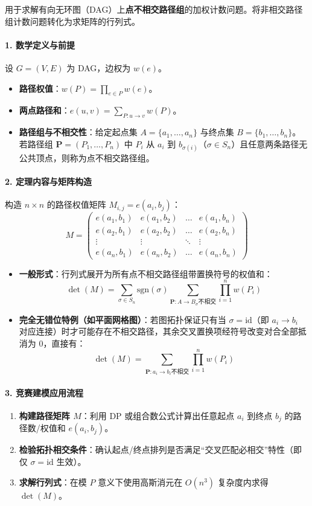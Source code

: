 \noindent
用于求解有向无环图（DAG）上\textbf{点不相交路径组}的加权计数问题。将非相交路径组计数问题转化为求矩阵的行列式。

\paragraph{1. 数学定义与前提}
设 $G = (V, E)$ 为 DAG，边权为 $w(e)$。
\begin{itemize}
    \item \textbf{路径权值}：$w(P) = \prod_{e \in P} w(e)$。
    \item \textbf{两点路径和}：$e(u, v) = \sum_{P: u \to v} w(P)$。
    \item \textbf{路径组与不相交性}：给定起点集 $A = \{a_1, \dots, a_n\}$ 与终点集 $B = \{b_1, \dots, b_n\}$。若路径组 $\mathbf{P} = (P_1, \dots, P_n)$ 中 $P_i$ 从 $a_i$ 到 $b_{\sigma(i)}$（$\sigma \in S_n$）且任意两条路径无公共顶点，则称为点不相交路径组。
\end{itemize}

\paragraph{2. 定理内容与矩阵构造}
构造 $n \times n$ 的路径权值矩阵 $M_{i, j} = e(a_i, b_j)$：
\[
M = \begin{pmatrix} 
e(a_1, b_1) & e(a_1, b_2) & \dots & e(a_1, b_n) \\ 
e(a_2, b_1) & e(a_2, b_2) & \dots & e(a_2, b_n) \\ 
\vdots & \vdots & \ddots & \vdots \\ 
e(a_n, b_1) & e(a_n, b_2) & \dots & e(a_n, b_n) 
\end{pmatrix}
\]
\begin{itemize}
    \item \textbf{一般形式}：行列式展开为所有点不相交路径组带置换符号的权值和：
    \[
    \det(M) = \sum_{\sigma \in S_n} \mathrm{sgn}(\sigma) \sum_{\mathbf{P}: A \to B_\sigma \text{不相交}} \prod_{i=1}^n w(P_i)
    \]
    \item \textbf{完全无错位特例（如平面网格图）}：若图拓扑保证只有当 $\sigma = \mathrm{id}$（即 $a_i \to b_i$ 对应连接）时才可能存在不相交路径，其余交叉置换项经符号改变对合全部抵消为 $0$，直接有：
    \[
    \det(M) = \sum_{\mathbf{P}: a_i \to b_i \text{不相交}} \prod_{i=1}^n w(P_i)
    \]
\end{itemize}

\paragraph{3. 竞赛建模应用流程}
\begin{enumerate}
    \item \textbf{构建路径矩阵 $M$}：利用 DP 或组合数公式计算出任意起点 $a_i$ 到终点 $b_j$ 的路径数/权值和 $e(a_i, b_j)$。
    \item \textbf{检验拓扑相交条件}：确认起点/终点排列是否满足“交叉匹配必相交”特性（即仅 $\sigma = \mathrm{id}$ 生效）。
    \item \textbf{求解行列式}：在模 $P$ 意义下使用高斯消元在 $O(n^3)$ 复杂度内求得 $\det(M)$。
\end{enumerate}
